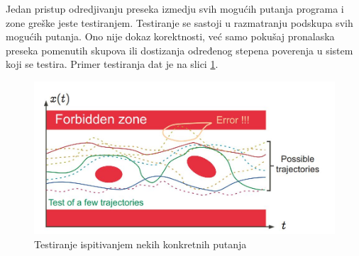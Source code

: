 \documentclass[a4paper]{article}
\begin{document}
Jedan pristup odredjivanju preseka izmedju svih mogućih putanja programa i zone greške jeste testiranjem. Testiranje se sastoji u razmatranju podskupa svih mogućih putanja. Ono nije dokaz korektnosti, već samo pokušaj pronalaska preseka pomenutih skupova ili dostizanja određenog stepena poverenja u sistem koji se testira. Primer testiranja dat je na slici \ref{fig:graf3}.
\begin{figure}[h!]
\begin{center}
\includegraphics[scale=0.3]{graf3.JPG}
\end{center}
\caption{Testiranje ispitivanjem nekih konkretnih putanja}
\label{fig:graf3}
\end{figure} \newline
\end{document}
